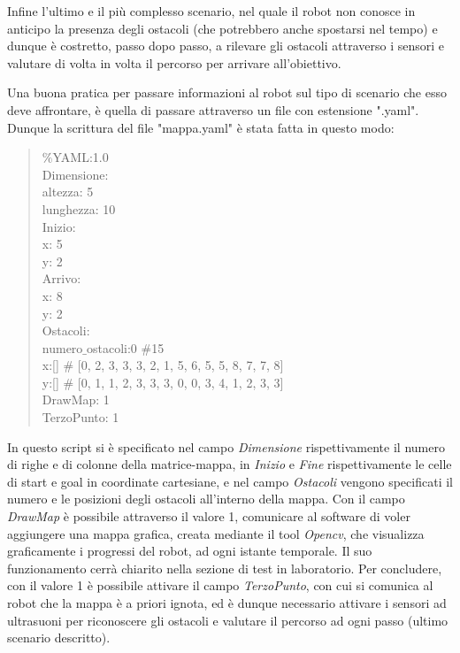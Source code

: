\documentclass[english]{article}
\begin{document}
Infine l'ultimo e il più complesso scenario, nel quale il robot non conosce in anticipo la presenza degli ostacoli (che potrebbero anche spostarsi nel tempo) e dunque è costretto, passo dopo passo, a rilevare gli ostacoli attraverso i sensori e valutare di volta in volta il percorso per arrivare all'obiettivo. 

Una buona pratica per passare informazioni al robot sul tipo di scenario che esso deve affrontare, è quella di passare attraverso un file con estensione ".yaml". Dunque la scrittura del file "mappa.yaml" è stata fatta in questo modo:
\begin{verse}
$\%$YAML:1.0\\
Dimensione: \\
 altezza: 5\\
 lunghezza: 10\\ 
Inizio: \\
 x: 5\\
 y: 2\\
Arrivo:\\
 x: 8\\
 y: 2\\
Ostacoli:\\
 numero$\_$ostacoli:0 $\#$15\\
 x:[] $\#$ [0, 2, 3, 3, 3, 2, 1, 5, 6, 5, 5, 8, 7, 7, 8]\\
 y:[] $\#$ [0, 1, 1, 2, 3, 3, 3, 0, 0, 3, 4, 1, 2, 3, 3]\\
DrawMap: 1\\
TerzoPunto: 1\\
\end{verse}
In questo script si è specificato nel campo \textit{Dimensione} rispettivamente il numero di righe e di colonne della matrice-mappa, in \textit{Inizio} e \textit{Fine} rispettivamente le celle di start e goal in coordinate cartesiane, e nel campo \textit{Ostacoli} vengono specificati il numero e le posizioni degli ostacoli all'interno della mappa. 
Con il campo \textit{DrawMap} è possibile attraverso il valore 1, comunicare al software di voler aggiungere una mappa grafica, creata mediante il tool \textit{Opencv}, che visualizza graficamente i progressi del robot, ad ogni istante temporale. Il suo funzionamento cerrà chiarito nella sezione di test in laboratorio.
Per concludere, con il valore 1 è possibile attivare il campo \textit{TerzoPunto}, con cui si comunica al robot che la mappa è a priori ignota, ed è dunque necessario attivare i sensori ad ultrasuoni per riconoscere gli ostacoli e valutare il percorso ad ogni passo (ultimo scenario descritto).
\end{document}
